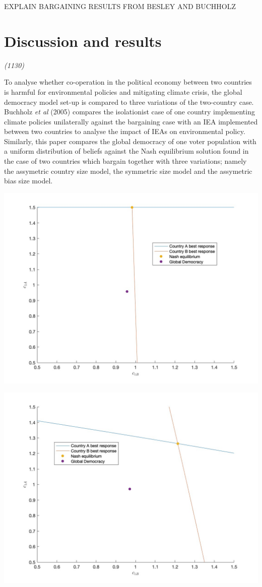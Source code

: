 \documentclass[11pt,preprint, authoryear]{elsarticle}
\let\origfigure\figure
\let\endorigfigure\endfigure
\renewenvironment{figure}[1][2] {
    \expandafter\origfigure\expandafter[H]
} {
    \endorigfigure
}
\numberwithin{equation}{section}
\numberwithin{figure}{section}
\numberwithin{table}{section}
\begin{document}
EXPLAIN BARGAINING RESULTS FROM BESLEY AND BUCHHOLZ

\hypertarget{discussion-and-results}{%
\section{Discussion and results}\label{discussion-and-results}}

\emph{(1130)}

To analyse whether co-operation in the political economy between two
countries is harmful for environmental policies and mitigating climate
crisis, the global democracy model set-up is compared to three
variations of the two-country case. Buchholz \emph{et al} (2005)
compares the isolationist case of one country implementing climate
policies unilaterally against the bargaining case with an IEA
implemented between two countries to analyse the impact of IEAs on
environmental policy. Similarly, this paper compares the global
democracy of one voter population with a uniform distribution of beliefs
against the Nash equilibrium solution found in the case of two countries
which bargain together with three variations; namely the assymetric
country size model, the symmetric size model and the assymetric bias
size model.

\newpage

\begin{figure}[H]

{\centering \includegraphics[width=0.45\linewidth]{images/Fig2_0.1Size0Bias} 

}

\caption{Nash equilibrium for assymetric country size model}\label{fig:unnamed-chunk-2}
\end{figure}

\begin{figure}[H]

{\centering \includegraphics[width=0.45\linewidth]{images/Fig2_0.5Size0Bias} 

}

\caption{Nash equilibrium for symmetric country size model}\label{fig:unnamed-chunk-3}
\end{figure}
\end{document}
